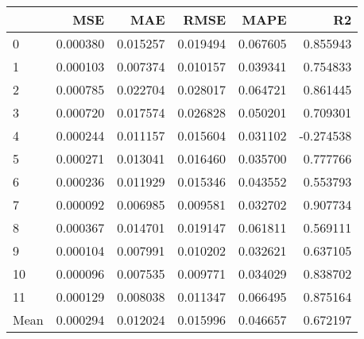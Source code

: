 \begin{tabular}{lrrrrr}
\toprule
 & MSE & MAE & RMSE & MAPE & R2 \\
\midrule
0 & 0.000380 & 0.015257 & 0.019494 & 0.067605 & 0.855943 \\
1 & 0.000103 & 0.007374 & 0.010157 & 0.039341 & 0.754833 \\
2 & 0.000785 & 0.022704 & 0.028017 & 0.064721 & 0.861445 \\
3 & 0.000720 & 0.017574 & 0.026828 & 0.050201 & 0.709301 \\
4 & 0.000244 & 0.011157 & 0.015604 & 0.031102 & -0.274538 \\
5 & 0.000271 & 0.013041 & 0.016460 & 0.035700 & 0.777766 \\
6 & 0.000236 & 0.011929 & 0.015346 & 0.043552 & 0.553793 \\
7 & 0.000092 & 0.006985 & 0.009581 & 0.032702 & 0.907734 \\
8 & 0.000367 & 0.014701 & 0.019147 & 0.061811 & 0.569111 \\
9 & 0.000104 & 0.007991 & 0.010202 & 0.032621 & 0.637105 \\
10 & 0.000096 & 0.007535 & 0.009771 & 0.034029 & 0.838702 \\
11 & 0.000129 & 0.008038 & 0.011347 & 0.066495 & 0.875164 \\
Mean & 0.000294 & 0.012024 & 0.015996 & 0.046657 & 0.672197 \\
\bottomrule
\end{tabular}
